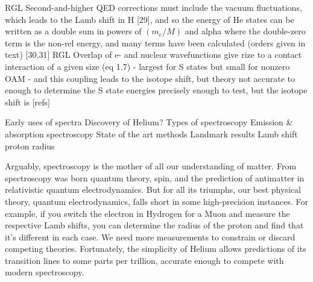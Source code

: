 			RGL Second-and-higher QED corrections must include the vacuum fluctuations, which leads to the Lamb shift in H [29], and so the energy of He states can be written as a double sum in powers of $(m_e/M)$ and alpha where the double-zero term is the non-rel energy, and many terms have been calculated (orders given in text) [30,31]  
			RGL Overlap of e- and nuclear wavefunctions give rize to a contact interaction of a given size (eq 1.7) - largest for S states but small for nonzero OAM - and this coupling leads to the isotope shift, but theory not accurate to enough to determine the S state energies precisely enough to test, but the isotope shift is [refs] 

Early uses of spectra Discovery of Helium? Types of spectroscopy
Emission \& absorption spectroscopy State of the art methods Landmark
results Lamb shift proton radius

Arguably, spectroscopy is the mother of all our understanding of matter. From spectroscopy was born quantum theory, spin, and the prediction of antimatter in relativistic quantum electrodynamics. But for all its triumphs, our best physical theory, quantum electrodynamics, falls short in some high-precision instances. For example, if you switch the electron in Hydrogen for a Muon and measure the respective Lamb shifts, you can determine the radius of the proton and find that it's different in each case. We need more measurements to constrain or discard competing theories. Fortunately, the simplicity of Helium allows predictions of its transition lines to some parts per trillion, accurate enough to compete with modern spectroscopy.

